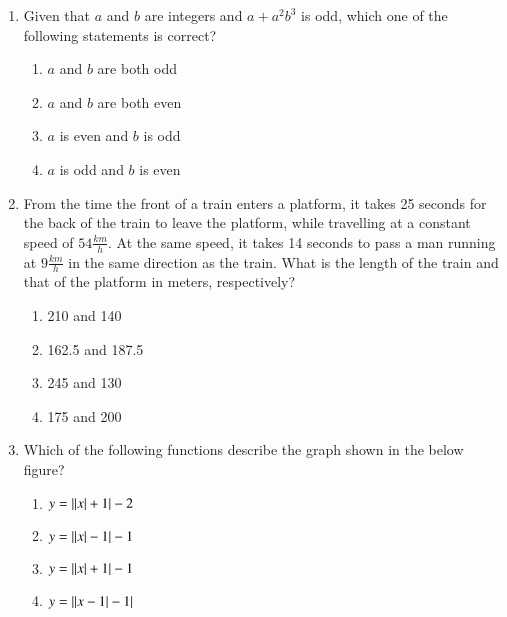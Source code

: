 \documentclass[journal]{IEEEtran}
\numberwithin{equation}{enumi}
\numberwithin{figure}{enumi}
\begin{document}
\begin{enumerate}
	\item 
	Given that $a$ and $b$ are integers and $a + a^2b^3$ is odd, which one of the following statements is correct?

	\begin{enumerate}
		\item $a$ and $b$ are both odd
		\item $a$ and $b$ are both even 
		\item $a$ is even and $b$ is odd 
		\item $a$ is odd and $b$ is even 
	\end{enumerate}

	\item 
	From the time the front of a train enters a platform, it takes 25 seconds for the back of the train to leave the platform, while travelling at a constant speed of $54 \frac{km}{h}$. At the same speed, it takes 14 seconds to pass a man running at $9\frac{km}{h}$ in the same direction as the train. What is the length of the train and that of the platform in meters, respectively?

	\hfill{}
	\begin{multicols}{2}
		\begin{enumerate}
			\item 210 and 140
			\item 162.5 and 187.5
			\item 245 and 130
			\item 175 and 200
		\end{enumerate}
	\end{multicols}

	\item 
	Which of the following functions describe the graph shown in the below figure?
	
	\begin{figure}[H]
		\centering
		\resizebox{0.4\textwidth}{!}{}
	\end{figure}

	\hfill{}
	\begin{multicols}{2}
		\begin{enumerate}
			\item $y = \left\vert\left\vert x\right\vert + 1\right\vert - 2$
			\item $y = \left\vert\left\vert x\right\vert - 1\right\vert - 1$
			\item $y = \left\vert\left\vert x\right\vert + 1\right\vert - 1$
			\item $y = \left\vert\left\vert x - 1\right\vert - 1\right\vert$
		\end{enumerate}
	\end{multicols}


\end{enumerate}
\end{document}
